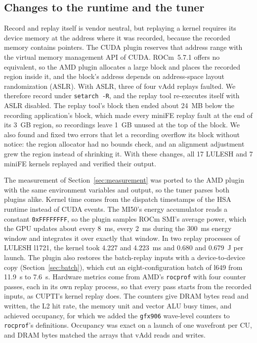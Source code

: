 \documentclass[10pt]{article}
\newcommand{\code}[1]{\texttt{#1}}
\begin{document}
\subsection{Changes to the runtime and the tuner}
\label{sec:amd-port}
Record and replay itself is vendor neutral, but replaying a kernel requires
its device memory at the address where it was recorded, because the recorded
memory contains pointers. The CUDA plugin reserves that address range with the
virtual memory management API of CUDA. ROCm~5.7.1 offers no equivalent, so the
AMD plugin allocates a large block and places the recorded region inside it,
and the block's address depends on address-space layout randomization (ASLR).
With ASLR, three of four vAdd replays faulted. We therefore record under
\code{setarch -R}, and the replay tool re-executes itself with ASLR disabled.
The replay tool's block then ended about 24~MB below the recording
application's block, which made every miniFE replay fault at the end of its
3~GB region, so recordings leave 1~GB unused at the top of the block. We also
found and fixed two errors that let a recording overflow its block without
notice: the region allocator had no bounds check, and an alignment adjustment
grew the region instead of shrinking it. With these changes, all 17 LULESH and
7 miniFE kernels replayed and verified their output.

The measurement of Section~\ref{sec:measurement} was ported to the AMD plugin
with the same environment variables and output, so the tuner parses both
plugins alike. Kernel time comes from the dispatch timestamps of the HSA
runtime instead of CUDA events. The MI50's energy accumulator reads a constant
\code{0xFFFFFFFF}, so the plugin samples ROCm SMI's average power, which the
GPU updates about every 8~ms, every 2~ms during the 300~ms energy window and
integrates it over exactly that window. In two replay processes of LULESH
l1721, the kernel took 4.227 and 4.223~ms and 0.680 and 0.679~J per launch. The
plugin also restores the batch-replay inputs with a device-to-device copy
(Section~\ref{sec:batch}), which cut an eight-configuration batch of l649 from
11.9~s to 7.6~s. Hardware metrics come from AMD's \code{rocprof} with four
counter passes, each in its own replay process, so that every pass starts from
the recorded inputs, as CUPTI's kernel replay does. The counters give DRAM bytes
read and written, the L2 hit rate, the memory unit and vector ALU busy times,
and achieved occupancy, for which we added the \code{gfx906} wave-level
counters to \code{rocprof}'s definitions. Occupancy was exact on a launch of
one wavefront per CU, and DRAM bytes matched the arrays that vAdd reads and
writes.
\end{document}
